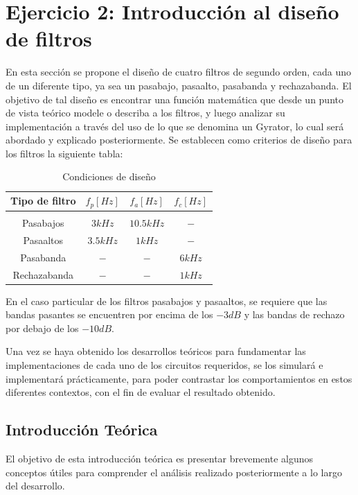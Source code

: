 \section{Ejercicio 2: Introducci\'on al dise\~no de filtros}
En esta secci\'on se propone el dise\~no de cuatro filtros de segundo orden, cada uno de un diferente tipo,
ya sea un pasabajo, pasaalto, pasabanda y rechazabanda. El objetivo de tal dise\~no es encontrar una funci\'on matem\'atica
que desde un punto de vista te\'orico modele o describa a los filtros, y luego analizar su implementaci\'on a trav\'es del uso de lo que se
denomina un Gyrator, lo cual ser\'a abordado y explicado posteriormente. Se establecen como criterios de dise\~no para los filtros la siguiente tabla:

\begin{table}[H]
    \centering
    \begin{tabular}{c c c c}
        Tipo de filtro & $f_p [Hz]$ & $f_a [Hz]$ & $f_c [Hz]$ \\
        \hline \\
        Pasabajos & $3kHz$ & $10.5kHz$ & $-$ \\
        Pasaaltos & $3.5kHz$ & $1kHz$ & $-$ \\
        Pasabanda & $-$ & $-$ & $6kHz$ \\
        Rechazabanda & $-$ & $-$ & $1kHz$ \\
        \hline
    \end{tabular}
    \caption{Condiciones de dise\~no}
\end{table}

En el caso particular de los filtros pasabajos y pasaaltos, se requiere que las bandas pasantes se encuentren por encima de los $-3dB$ y las bandas de rechazo por debajo
de los $-10dB$.

Una vez se haya obtenido los desarrollos te\'oricos para fundamentar las implementaciones de cada uno de los circuitos requeridos, se los simular\'a e
implementar\'a pr\'acticamente, para poder contrastar los comportamientos en estos diferentes contextos, con el fin de evaluar el resultado obtenido.

\subsection{Introducci\'on Te\'orica}
El objetivo de esta introducci\'on te\'orica es presentar brevemente algunos conceptos \'utiles para comprender el an\'alisis realizado posteriormente a lo largo del desarrollo.

